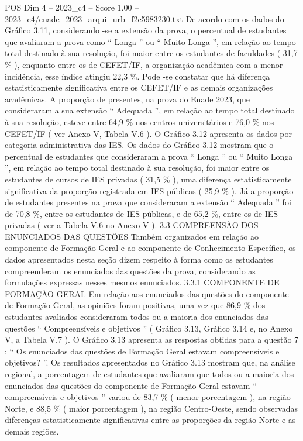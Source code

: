 \begin{textsample}{POS Dim 4 – 2023\_c4 – Score 1.00 – 2023\_c4/enade\_2023\_arqui\_urb\_f2c5983230.txt}
De acordo com os dados do Gráfico 3.11, considerando -se a extensão da prova, o percentual de estudantes que avaliaram a prova como “ Longa ” ou “ Muito Longa ”, em relação ao tempo total destinado à sua resolução, foi maior entre os estudantes de faculdades ( 31,7 \% ), enquanto entre os de CEFET/IF, a organização acadêmica com a menor incidência, esse índice atingiu 22,3 \%.
Pode -se constatar que há diferença estatisticamente significativa entre os CEFET/IF e as demais organizações acadêmicas.
A proporção de presentes, na prova do Enade 2023, que consideraram a sua extensão “ Adequada ”, em relação ao tempo total destinado à sua resolução, esteve entre 64,9 \% nos centros universitários e 76,0 \% nos CEFET/IF ( ver Anexo V, Tabela V.6 ).
O Gráfico 3.12 apresenta os dados por categoria administrativa das IES.
Os dados do Gráfico 3.12 mostram que o percentual de estudantes que consideraram a prova “ Longa ” ou “ Muito Longa ”, em relação ao tempo total destinado à sua resolução, foi maior entre os estudantes de cursos de IES privadas ( 31,5 \% ), uma diferença estatisticamente significativa da proporção registrada em IES públicas ( 25,9 \% ).
Já a proporção de estudantes presentes na prova que consideraram a extensão “ Adequada ” foi de 70,8 \%, entre os estudantes de IES públicas, e de 65,2 \%, entre os de IES privadas ( ver a Tabela V.6 no Anexo V ). 3.3 COMPREENSÃO DOS ENUNCIADOS DAS QUESTÕES Também organizados em relação ao componente de Formação Geral e ao componente de Conhecimento Específico, os dados apresentados nesta seção dizem respeito à forma como os estudantes compreenderam os enunciados das questões da prova, considerando as formulações expressas nesses mesmos enunciados. 3.3.1 COMPONENTE DE FORMAÇÃO GERAL Em relação aos enunciados das questões do componente de Formação Geral, as opiniões foram positivas, uma vez que 86,9 \% dos estudantes avaliados consideraram todos ou a maioria dos enunciados das questões “ Compreensíveis e objetivos ” ( Gráfico 3.13, Gráfico 3.14 e, no Anexo V, a Tabela V.7 ).
O Gráfico 3.13 apresenta as respostas obtidas para a questão 7 : “ Os enunciados das questões de Formação Geral estavam compreensíveis e objetivos? ”.
Os resultados apresentados no Gráfico 3.13 mostram que, na análise regional, a porcentagem de estudantes que avaliaram que todos ou a maioria dos enunciados das questões do componente de Formação Geral estavam “ compreensíveis e objetivos ” variou de 83,7 \% ( menor porcentagem ), na região Norte, e 88,5 \% ( maior porcentagem ), na região Centro-Oeste, sendo observadas diferenças estatisticamente significativas entre as proporções da região Norte e as demais regiões.

\end{textsample}
